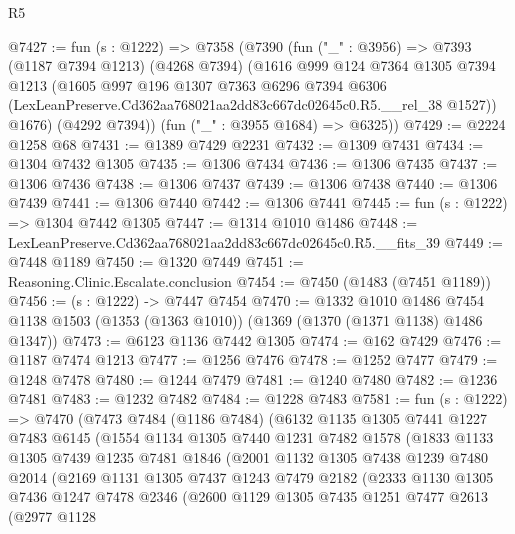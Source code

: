 \begin{lexlean}{R5}
\begin{coremodule}
@7427 := fun (s : @1222) =>
  @7358
    (@7390
      (fun ("_" : @3956) =>
      @7393
        (@1187 @7394 @1213)
        (@4268 @7394)
        (@1616
          @999
          @124
          @7364
          @1305
          @7394
          @1213
          (@1605
            @997
            @196
            @1307
            @7363
            @6296
            @7394
            @6306
            (LexLeanPreserve.Cd362aa768021aa2dd83c667dc02645c0.R5.__rel_38 @1527))
          @1676)
        (@4292 @7394))
      (fun ("_" : @3955 @1684) => @6325))
@7429 := @2224 @1258 @68
@7431 := @1389 @7429 @2231
@7432 := @1309 @7431
@7434 := @1304 @7432 @1305
@7435 := @1306 @7434
@7436 := @1306 @7435
@7437 := @1306 @7436
@7438 := @1306 @7437
@7439 := @1306 @7438
@7440 := @1306 @7439
@7441 := @1306 @7440
@7442 := @1306 @7441
@7445 := fun (s : @1222) => @1304 @7442 @1305
@7447 := @1314 @1010 @1486
@7448 := LexLeanPreserve.Cd362aa768021aa2dd83c667dc02645c0.R5.__fits_39
@7449 := @7448 @1189
@7450 := @1320 @7449
@7451 := Reasoning.Clinic.Escalate.conclusion
@7454 := @7450 (@1483 (@7451 @1189))
@7456 := (s : @1222) -> @7447 @7454
@7470 := @1332
    @1010
    @1486
    @7454
    @1138
    @1503
    (@1353 (@1363 @1010))
    (@1369 (@1370 (@1371 @1138) @1486 @1347))
@7473 := @6123 @1136 @7442 @1305
@7474 := @162 @7429
@7476 := @1187 @7474 @1213
@7477 := @1256 @7476
@7478 := @1252 @7477
@7479 := @1248 @7478
@7480 := @1244 @7479
@7481 := @1240 @7480
@7482 := @1236 @7481
@7483 := @1232 @7482
@7484 := @1228 @7483
@7581 := fun (s : @1222) =>
  @7470
    (@7473
      @7484
      (@1186 @7484)
      (@6132
        @1135
        @1305
        @7441
        @1227
        @7483
        @6145
        (@1554
          @1134
          @1305
          @7440
          @1231
          @7482
          @1578
          (@1833
            @1133
            @1305
            @7439
            @1235
            @7481
            @1846
            (@2001
              @1132
              @1305
              @7438
              @1239
              @7480
              @2014
              (@2169
                @1131
                @1305
                @7437
                @1243
                @7479
                @2182
                (@2333
                  @1130
                  @1305
                  @7436
                  @1247
                  @7478
                  @2346
                  (@2600
                    @1129
                    @1305
                    @7435
                    @1251
                    @7477
                    @2613
                    (@2977
                      @1128

\end{coremodule}
\end{lexlean}
